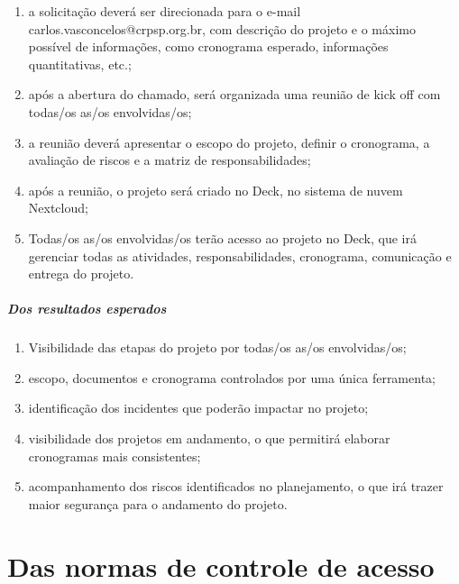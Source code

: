 \documentclass[openright, twoside, a4paper]{memoir}
\begin{document}
\begin{enumerate}

\item
    a solicitação deverá ser direcionada para o e-mail
    carlos.vasconcelos@crpsp.org.br, com descrição do projeto e o máximo
    possível de informações, como cronograma esperado, informações
    quantitativas, etc.;
\item
    após a abertura do chamado, será organizada uma reunião de kick off
    com todas/os as/os envolvidas/os;
\item
    a reunião deverá apresentar o escopo do projeto, definir o cronograma,
    a avaliação de riscos e a matriz de responsabilidades;
\item
    após a reunião, o projeto será criado no Deck, no sistema de nuvem
    Nextcloud;
\item
    Todas/os as/os envolvidas/os terão acesso ao projeto no Deck, que irá
    gerenciar todas as atividades, responsabilidades, cronograma,
    comunicação e entrega do projeto.
\end{enumerate}

\paragraph{Dos resultados
esperados}

\begin{enumerate}

\item
    Visibilidade das etapas do projeto por todas/os as/os envolvidas/os;
\item
    escopo, documentos e cronograma controlados por uma única ferramenta;
\item
    identificação dos incidentes que poderão impactar no projeto;
\item
    visibilidade dos projetos em andamento, o que permitirá elaborar
    cronogramas mais consistentes;
\item
    acompanhamento dos riscos identificados no planejamento, o que irá
    trazer maior segurança para o andamento do projeto.
\end{enumerate}

\clearpage\chapter{Das normas de controle de
acesso}
\end{document}

